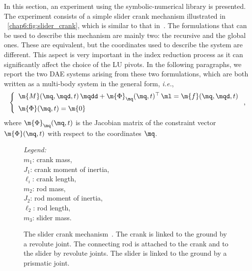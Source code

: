In this section, an experiment using the symbolic-numerical \Indigo{} library is presented. The experiment consists of a simple slider crank mechanism illustrated in \figurename~\ref{chap6:fig:slider_crank}, which is similar to that in~\cite{zhou2007symbolic}. The formulations that can be used to describe this mechanism are mainly two: the recursive and the global ones. These are equivalent, but the coordinates used to describe the system are different. This aspect is very important in the index reduction process as it can significantly affect the choice of the LU pivots. In the following paragraphs, we report the two \ac{DAE} systems arising from these two formulations, which are both written as a multi-body system in the general form, \emph{i.e.},
%
\begin{equation}
    \label{chap6:eq:multi_body_system}
    \left\{\begin{array}{l}
        \m{M}(\mq, \mqd, t) \, \mqdd + \m{\Phi}_{\mq}(\mq, t)^\top \, \ml = \m{f}(\mq, \mqd, t) \\[2mm]
        \m{\Phi}(\mq, t) = \m{0}
    \end{array}\right. \text{,}
\end{equation}
%
where $\m{\Phi}_{\mq}(\mq, t)$ is the Jacobian matrix of the constraint vector $\m{\Phi}(\mq, t)$ with respect to the coordinates $\mq$.

\begin{figure}[htp]
    \centering
    \begin{minipage}{0.5\textwidth}
    \end{minipage}
    \hspace{2pt}
    \begin{minipage}{0.35\textwidth}
        \small\emph{Legend:}\\
        $m_1$: crank mass, \\
        $J_1$: crank moment of inertia, \\
        $\ell_i$: crank length, \\
        $m_2$: rod mass, \\
        $J_2$: rod moment of inertia, \\
        $\ell_2$: rod length, \\
        $m_3$: slider mass. \\
    \end{minipage}
    \caption{The slider crank mechanism~\cite{zhou2007symbolic}. The crank is linked to the ground by a revolute joint. The connecting rod is attached to the crank and to the slider by revolute joints. The slider is linked to the ground by a prismatic joint.}
    \label{chap6:chap6:fig:slider_crank}
\end{figure}

